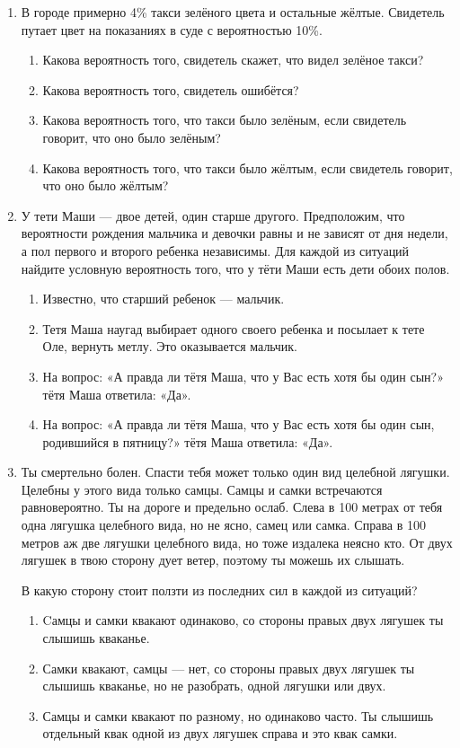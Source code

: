 \documentclass[a4paper, 12pt]{article}
\begin{document}
\newpage
\begin{enumerate}

\item  В городе примерно 4\% такси зелёного цвета и остальные жёлтые. Свидетель путает цвет на показаниях в суде с вероятностью 10\%.

\begin{enumerate}
\item Какова вероятность того, свидетель скажет, что видел зелёное такси?
\item Какова вероятность того, свидетель ошибётся?
\item Какова вероятность того, что такси было зелёным, если свидетель говорит, что оно было зелёным?
\item Какова вероятность того, что такси было жёлтым, если свидетель говорит, что оно было жёлтым?
\end{enumerate}


\item У тети Маши — двое детей, один старше другого. Предположим, что вероятности рождения мальчика и девочки равны и не зависят от дня недели, а пол первого и второго ребенка независимы. Для каждой из ситуаций найдите условную вероятность того, что у тёти Маши есть дети обоих полов.
\begin{enumerate}
\item Известно, что старший ребенок — мальчик.
\item Тетя Маша наугад выбирает одного своего
ребенка и посылает к тете Оле, вернуть метлу. Это оказывается мальчик.
\item На вопрос: «А правда ли тётя Маша, что у Вас есть хотя бы один сын?» тётя Маша ответила: «Да».
\item На вопрос: «А правда ли тётя Маша, что у Вас есть хотя бы один сын, родившийся в пятницу?» тётя Маша ответила: «Да».
\end{enumerate}

\item Ты смертельно болен. Спасти тебя может только один вид  целебной лягушки. Целебны у этого вида только самцы. Самцы и самки встречаются равновероятно. Ты на дороге и предельно ослаб. Слева в 100 метрах от тебя одна лягушка целебного вида, но не ясно, самец или самка. Справа в 100 метров аж две лягушки целебного вида, но тоже издалека неясно кто. От двух лягушек в твою сторону дует ветер, поэтому ты можешь их слышать.

В какую сторону стоит ползти из последних сил в каждой из  ситуаций?
\begin{enumerate}
  \item Cамцы и самки квакают одинаково, со стороны правых двух лягушек ты слышишь кваканье.
  \item Самки квакают, самцы — нет, со стороны правых двух лягушек ты слышишь кваканье, но не разобрать, одной лягушки или двух.
  \item Самцы и самки квакают по разному, но одинаково часто. Ты слышишь отдельный квак одной из двух лягушек справа и это квак самки.
\end{enumerate}


\end{enumerate}
\end{document}
